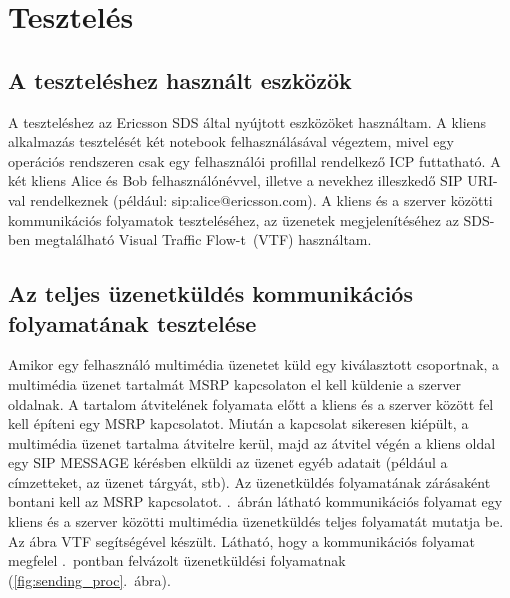 
\section{Tesztelés}

\subsection{A teszteléshez használt eszközök}
\label{sec:tesztelesi_eszkozok}

A teszteléshez az Ericsson SDS által nyújtott eszközöket használtam. A kliens alkalmazás tesztelését két notebook felhasználásával végeztem, mivel egy operációs rendszeren csak egy felhasználói profillal rendelkező ICP futtatható. A két kliens Alice és Bob felhasználónévvel, illetve a nevekhez illeszkedő SIP URI-val rendelkeznek (például: sip:alice@ericsson.com). A kliens és a szerver közötti kommunikációs folyamatok teszteléséhez, az üzenetek megjelenítéséhez az SDS-ben megtalálható Visual Traffic Flow-t~(VTF) használtam. 

\subsection{Az teljes üzenetküldés kommunikációs folyamatának tesztelése}
\label{sec:teszteles_teljes_kuldes}

Amikor egy felhasználó multimédia üzenetet küld egy kiválasztott csoportnak, a multimédia üzenet tartalmát MSRP kapcsolaton el kell küldenie a szerver oldalnak. A tartalom átvitelének folyamata előtt a kliens és a szerver között fel kell építeni egy MSRP kapcsolatot. Miután a kapcsolat sikeresen kiépült, a multimédia üzenet tartalma átvitelre kerül, majd az átvitel végén a kliens oldal egy SIP MESSAGE kérésben elküldi az üzenet egyéb adatait (például a címzetteket, az üzenet tárgyát, stb). Az üzenetküldés folyamatának zárásaként bontani kell az MSRP kapcsolatot. .~ábrán látható kommunikációs folyamat egy kliens és a szerver közötti multimédia üzenetküldés teljes folyamatát mutatja be. Az ábra VTF segítségével készült. Látható, hogy a kommunikációs folyamat megfelel .~pontban felvázolt üzenetküldési folyamatnak (\ref{fig:sending_proc}.~ábra).

